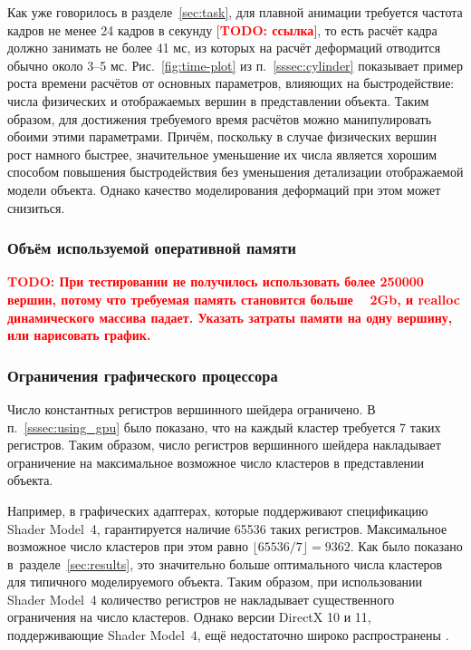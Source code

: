 \documentclass[a4paper, 14pt, titlepage]{extarticle}
\newcommand{\todo}[1]{\textbf{\textcolor{red}{TODO: #1}}}
\newcommand{\eng}[1]{{\English #1}}
\begin{document}
        Как уже говорилось в разделе~\ref{sec:task}, для плавной анимации требуется частота кадров
        не менее 24 кадров в секунду [\todo{ссылка}], то есть расчёт кадра должно занимать не более 41
        мс, из которых на расчёт деформаций отводится обычно около 3--5 мс. Рис.~\ref{fig:time-plot}
        из п.~\ref{sssec:cylinder} показывает пример роста времени расчётов от основных параметров,
        влияющих на быстродействие: числа физических и отображаемых вершин в представлении объекта.
        Таким образом, для достижения требуемого время расчётов можно манипулировать обоими этими
        параметрами. Причём, поскольку в случае физических вершин рост намного быстрее, значительное
        уменьшение их числа является хорошим способом повышения быстродействия без уменьшения
        детализации отображаемой модели объекта. Однако качество моделирования деформаций при этом
        может снизиться.

      \subsubsection{Объём используемой оперативной памяти}

        \todo{При тестировании не получилось использовать более 250000 вершин, потому что требуемая
        память становится больше ~ 2Gb, и realloc динамического массива падает. Указать затраты
        памяти на одну вершину, или нарисовать график.}

      \subsubsection{Ограничения графического процессора}

        Число константных регистров вершинного шейдера ограничено. В п.~\ref{sssec:using_gpu} было
        показано, что на каждый кластер требуется 7 таких регистров. Таким образом, число регистров
        вершинного шейдера накладывает ограничение на максимальное возможное число кластеров в
        представлении объекта.

        Например, в графических адаптерах, которые поддерживают спецификацию \eng{Shader Model~4},
        гарантируется наличие 65536 таких регистров. Максимальное возможное число
        кластеров при этом равно $\lfloor 65536/7 \rfloor = 9362$. Как было показано
        в~разделе~\ref{sec:results}, это значительно больше оптимального числа кластеров для
        типичного моделируемого объекта. Таким образом, при использовании \eng{Shader Model~4}
        количество регистров не накладывает существенного ограничения на число кластеров. Однако
        версии DirectX 10 и 11, поддерживающие \eng{Shader Model~4}, ещё недостаточно широко
        распространены \cite{steam-hardware}.
\end{document}

